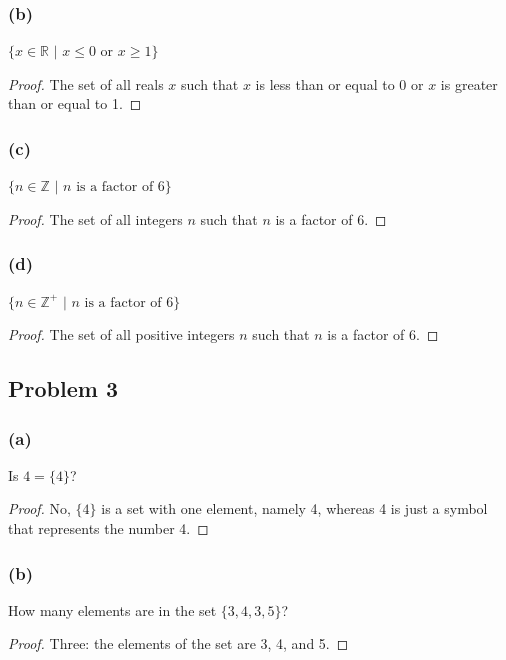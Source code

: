 \documentclass[14pt]{extarticle}
\newcommand{\R}{\mathbb{R}}
\newcommand{\Z}{\mathbb{Z}}
\begin{document}
\subsubsection{(b)}
$\{x \in \R \,\, | \,\, x \leq 0 \text{ or } x \geq 1\}$

\begin{proof}
The set of all reals $x$ such that $x$ is less than or equal to 0 or $x$ is
greater than or equal to 1.
\end{proof}

\subsubsection{(c)}
$\{n \in \Z \,\, | \,\, n \text{ is a factor of } 6\}$

\begin{proof}
The set of all integers $n$ such that $n$ is a factor of 6.
\end{proof}

\subsubsection{(d)}
$\{n \in \Z^+ \,\, | \,\, n \text{ is a factor of } 6\}$

\begin{proof}
The set of all positive integers $n$ such that $n$ is a factor of 6.
\end{proof}


\subsection{Problem 3}
\subsubsection{(a)}
Is $4 = \{4\}$?

\begin{proof}
No, $\{4\}$ is a set with one element, namely 4, whereas 4 is just a symbol that
 represents the number 4.
\end{proof}

\subsubsection{(b)}
How many elements are in the set $\{3, 4, 3, 5\}$?

\begin{proof}
Three: the elements of the set are 3, 4, and 5.
\end{proof}
\end{document}

